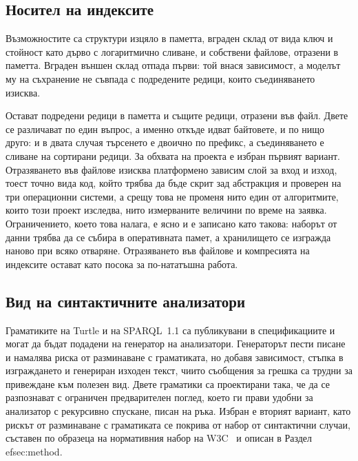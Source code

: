 \subsection{Носител на индексите}

Възможностите са структури изцяло в паметта, вграден склад от вида ключ и стойност
като дърво с логаритмично сливане, и собствени файлове, отразени в паметта. Вграден
външен склад отпада първи: той внася зависимост, а моделът му на съхранение не съвпада
с подредените редици, които съединяването изисква.

Остават подредени редици в паметта и същите редици, отразени във файл. Двете се
различават по един въпрос, а именно откъде идват байтовете, и по нищо друго: и в двата
случая търсенето е двоично по префикс, а съединяването е сливане на сортирани редици.
За обхвата на проекта е избран първият вариант. Отразяването във файлове изисква
платформено зависим слой за вход и изход, тоест точно вида код, който трябва да бъде
скрит зад абстракция и проверен на три операционни системи, а срещу това не променя
нито един от алгоритмите, които този проект изследва, нито измерваните величини по
време на заявка. Ограничението, което това налага, е ясно и е записано като такова:
наборът от данни трябва да се събира в оперативната памет, а хранилището се изгражда
наново при всяко отваряне. Отразяването във файлове и компресията на индексите остават
като посока за по-нататъшна работа.

\subsection{Вид на синтактичните анализатори}

Граматиките на Turtle и на SPARQL~1.1 са публикувани в спецификациите и могат да
бъдат подадени на генератор на анализатори. Генераторът пести писане и намалява риска
от разминаване с граматиката, но добавя зависимост, стъпка в изграждането и
генериран изходен текст, чиито съобщения за грешка са трудни за привеждане към
полезен вид. Двете граматики са проектирани така, че да се разпознават с ограничен
предварителен поглед, което ги прави удобни за анализатор с рекурсивно спускане,
писан на ръка. Избран е вторият вариант, като рискът от разминаване с граматиката се
покрива от набор от синтактични случаи, съставен по образеца на нормативния набор на
W3C~\cite{w3c_sparql11_testsuite} и описан в Раздел~
ef{sec:method}.

